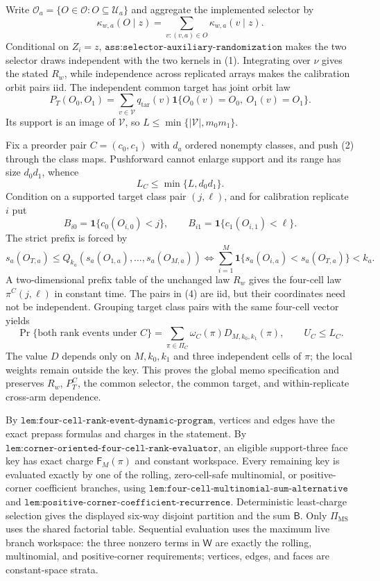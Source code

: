 Write
\(\mathcal O_a=\{O\in\mathcal O:O\subseteq\mathcal U_a\}\) and aggregate the implemented selector by
\[
\kappa_{w,a}(O\mid z)=
\sum_{v:(v,a)\in O}\kappa_{w,a}(v\mid z).
\tag{1}
\]
Conditional on \(Z_i=z\), \(\texttt{ass:selector-auxiliary-randomization}\) makes the two selector draws independent with the two kernels in (1). Integrating over \(\nu\) gives the stated \(R_w\), while independence across replicated arrays makes the calibration orbit pairs iid. The independent common target has joint orbit law
\[
P_T(O_0,O_1)=\sum_{v\in\mathcal V}q_{\mathrm{tar}}(v)
\mathbf 1\{O_0(v)=O_0,\ O_1(v)=O_1\}.
\tag{2}
\]
Its support is an image of \(\mathcal V\), so
\(L\le\min\{|\mathcal V|,m_0m_1\}\).

Fix a preorder pair \(C=(c_0,c_1)\) with \(d_a\) ordered nonempty classes, and push (2) through the class maps. Pushforward cannot enlarge support and its range has size \(d_0d_1\), whence
\[
L_C\le\min\{L,d_0d_1\}.
\tag{3}
\]
Condition on a supported target class pair \((j,\ell)\), and for calibration replicate \(i\) put
\[
B_{i0}=\mathbf 1\{c_0(O_{i,0})<j\},\qquad
B_{i1}=\mathbf 1\{c_1(O_{i,1})<\ell\}.
\tag{4}
\]
The strict prefix is forced by
\[
s_a(O_{T,a})\le Q_{k_a}(s_a(O_{1,a}),\ldots,s_a(O_{M,a}))
\iff
\sum_{i=1}^M\mathbf 1\{s_a(O_{i,a})<s_a(O_{T,a})\}<k_a.
\tag{5}
\]
A two-dimensional prefix table of the unchanged law \(R_w\) gives the four-cell law \(\pi^C(j,\ell)\) in constant time. The pairs in (4) are iid, but their coordinates need not be independent. Grouping target class pairs with the same four-cell vector yields
\[
\Pr\{\text{both rank events under }C\}
=\sum_{\pi\in\Pi_C}\omega_C(\pi)D_{M,k_0,k_1}(\pi),
\qquad U_C\le L_C.
\tag{6}
\]
The value \(D\) depends only on \(M,k_0,k_1\) and three independent cells of \(\pi\); the local weights remain outside the key. This proves the global memo specification and preserves \(R_w\), \(P_T^C\), the common selector, the common target, and within-replicate cross-arm dependence.

By \(\texttt{lem:four-cell-rank-event-dynamic-program}\), vertices and edges have the exact prepass formulas and charges in the statement. By
\(\texttt{lem:corner-oriented-four-cell-rank-evaluator}\), an eligible support-three face key has exact charge \(\mathsf F_M(\pi)\) and constant workspace. Every remaining key is evaluated exactly by one of the rolling,
zero-cell-safe multinomial, or positive-corner coefficient branches, using
\(\texttt{lem:four-cell-multinomial-sum-alternative}\) and
\(\texttt{lem:positive-corner-coefficient-recurrence}\). Deterministic least-charge selection gives the displayed six-way disjoint partition and the sum \(\mathsf B\). Only \(\Pi_{\mathrm{MS}}\) uses the shared factorial table. Sequential evaluation uses the maximum live branch workspace: the three nonzero terms in \(\mathsf W\) are exactly the rolling, multinomial, and positive-corner requirements; vertices, edges, and faces are constant-space strata.

